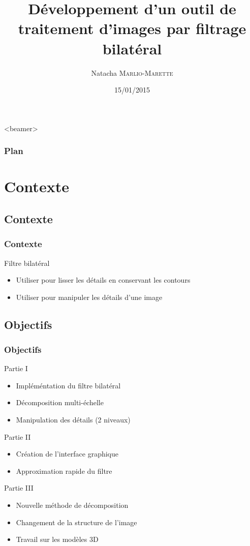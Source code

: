 \documentclass{polytech-presentation}
\title{Développement d’un outil de traitement
d’images par filtrage bilatéral}
\author{Natacha \textsc{Marlio-Marette}}
\date{15/01/2015}
\begin{document}
\frame{\titlepage}	

	\begin{frame}<beamer>
    \frametitle{Plan}
    \tableofcontents
  \end{frame}

\section{Contexte}
	\subsection{Contexte}
		\begin{frame}
		\frametitle{Contexte}	
		\begin{block}{Filtre bilatéral}
		\begin{itemize}
			\item Utiliser pour lisser les détails en conservant les contours
			\item Utiliser pour manipuler les détails d'une image 
		\end{itemize}
		\end{block}			
		\end{frame}

	\subsection{Objectifs}
		\begin{frame}
		\frametitle{Objectifs}
			\begin{block}{Partie I}
				\begin{itemize}
					\item Impléméntation du filtre bilatéral
					\item Décomposition multi-échelle
					\item Manipulation des détails (2 niveaux)
				\end{itemize}
			\end{block}
		\pause
			\begin{block}{Partie II}
				\begin{itemize}
					\item Création de l'interface graphique
					\item Approximation rapide du filtre
				\end{itemize}
			\end{block}
		\end{frame}
		
		\begin{frame}
			\begin{block}{Partie III}
				\begin{itemize}
					\item Nouvelle méthode de décomposition
					\item Changement de la structure de l'image
					\item Travail sur les modèles 3D
				\end{itemize}
			\end{block}
		\end{frame}			
		
\end{document}

